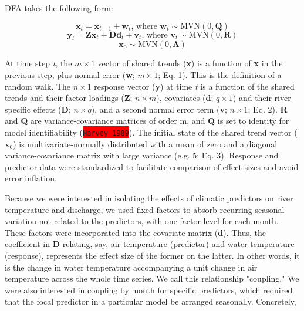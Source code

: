 \documentclass{article}
\begin{document}
DFA takes the following form:

\begin{equation}
    \textbf{x}_t = \textbf{x}_{t-1} + \textbf{w}_t\textrm{, where } \textbf{w}_t \sim \textrm{MVN}(0,\textbf{Q})
\end{equation}
\begin{equation}
    \textbf{y}_t = \textbf{Zx}_t + \textbf{Dd}_t + \textbf{v}_t\textrm{, where } \textbf{v}_t \sim \textrm{MVN}(0,\textbf{R})
\end{equation}
\begin{equation}
    \textbf{x}_0 \sim \textrm{MVN}(0,\bm{\Lambda})
\end{equation}

At time step {\it t}, the $m \times 1$ vector of shared trends (\textbf{x}) is a function of \textbf{x} in the previous step, plus normal error (\textbf{w}; $m\times 1$; Eq. 1). This is the definition of a random walk. The $n\times 1$ response vector (\textbf{y}) at time {\it t} is a function of the shared trends and their factor loadings (\textbf{Z}; $n\times m$), covariates (\textbf{d}; $q\times 1$) and their river-specific effects (\textbf{D}; $n\times q$), and a second normal error term (\textbf{v}; $n\times 1$; Eq. 2). \textbf{R} and \textbf{Q} are variance-covariance matrices of order m, and \textbf{Q} is set to identity for model identifiability (\colorbox{red}{\lstinline{Harvey 1989}}). The initial state of the shared trend vector ($\bm{x}_0$) is multivariate-normally distributed with a mean of zero and a diagonal variance-covariance matrix with large variance (e.g. 5; Eq. 3). Response and predictor data were standardized to facilitate comparison of effect sizes and avoid error inflation.


Because we were interested in isolating the effects of climatic predictors on river temperature and discharge, we used fixed factors to absorb recurring seasonal variation not related to the predictors, with one factor level for each month. These factors were incorporated into the covariate matrix (\textbf{d}). Thus, the coefficient in \textbf{D} relating, say, air temperature (predictor) and water temperature (response), represents the effect size of the former on the latter. In other words, it is the change in water temperature accompanying a unit change in air temperature across the whole time series. We call this relationship "coupling." We were also interested in coupling by month for specific predictors, which required that the focal predictor in a particular model be arranged seasonally. Concretely,
\end{document}
